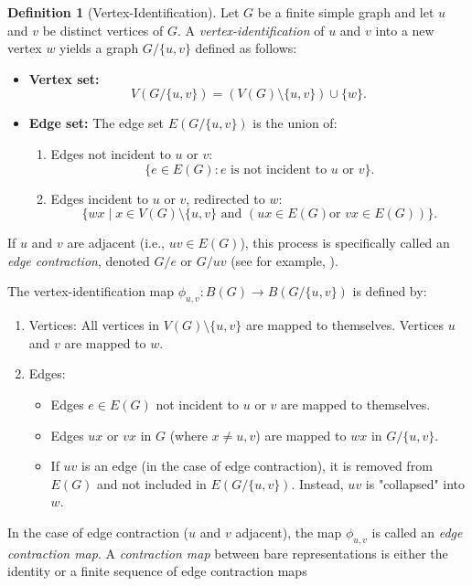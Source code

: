 \documentclass{amsart}
\theoremstyle{definition}
\newtheorem{definition}[theorem]{Definition}
\theoremstyle{remark}
\numberwithin{equation}{section}
\begin{document}
	\begin{definition}[Vertex-Identification]
		\label{Vertex-Identification}
		Let \(G\) be a finite simple graph and let \(u\) and \(v\) be distinct
		vertices
		of \(G\). A \textit{vertex-identification} of \(u\) and \(v\) into a new
		vertex
		\(w\) yields a graph \(G/\{u,v\}\) defined as follows:
		\begin{itemize}
			\item \textbf{Vertex set:}
			\[
			V(G/\{u,v\}) = (V(G) \setminus \{u,v\}) \cup \{w\}.
			\]
			\item \textbf{Edge set:}
			The edge set \(E(G/\{u,v\})\) is the union of:
			\begin{enumerate}
				\item Edges not incident to \(u\) or \(v\):
				\[
				\{e \in E(G) : e \text{ is not incident to } u \text{ or
				} v\}.
				\]
				\item Edges incident to \(u\) or \(v\), redirected to
				\(w\):
				\[
				\{wx \mid x \in V(G) \setminus \{u,v\} \text{ and } (ux
				\in E(G) \text{
					or } vx \in E(G))\}.
				\]
			\end{enumerate}
		\end{itemize}
		If \(u\) and \(v\) are adjacent (i.e., \(uv \in E(G)\)), this process is
		specifically called an \textit{edge contraction}, denoted \(G/e\) or \(G/uv\) (see for example, \cite{ChartrandZhang}).
		
		The vertex-identification map \(\phi_{u,v}: B(G) \rightarrow B(G/\{u,v\})\) is
		defined by:
		\begin{enumerate}
			\item Vertices: All vertices in \(V(G) \setminus \{u,v\}\) are
			mapped to
			themselves. Vertices \(u\) and \(v\) are mapped to \(w\).
			\item Edges:
			\begin{itemize}
				\item Edges \(e \in E(G)\) not incident to \(u\) or \(v\)
				are mapped to
				themselves.
				\item Edges \(ux\) or \(vx\) in \(G\) (where \(x \neq u,
				v\)) are mapped
				to \(wx\) in \(G/\{u,v\}\).
				\item If \(uv\) is an edge (in the case of edge
				contraction), it is
				removed from \(E(G)\) and not included in
				\(E(G/\{u,v\})\). Instead, \(uv\) is
				"collapsed" into \(w\).
			\end{itemize}
		\end{enumerate}
		In the case of edge contraction (\(u\) and \(v\) adjacent), the map \(\phi_{u,v}\) is called an \textit{edge contraction map}. A \textit{contraction map} between bare representations is either the identity or a finite sequence of edge contraction maps 
	\end{definition}
	
\end{document}
